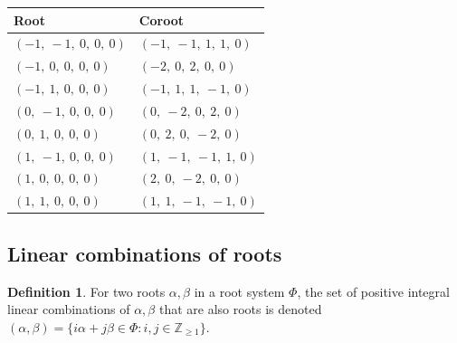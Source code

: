 \documentclass[11pt]{article}
\theoremstyle{definition}
\newtheorem{definition}{Definition}[section]
\begin{document}
\begin{tabular}{|l|l|}
    \hline
    \textbf{Root} & \textbf{Coroot} \\
    \hline
    $\left( -1, \  -1, \  0, \  0, \  0\right)$ & $\left( -1, \  -1, \  1, \  1, \  0\right)$ \\
    \hline
    $\left( -1, \  0, \  0, \  0, \  0\right)$ & $\left( -2, \  0, \  2, \  0, \  0\right)$ \\
    \hline
    $\left( -1, \  1, \  0, \  0, \  0\right)$ & $\left( -1, \  1, \  1, \  -1, \  0\right)$ \\
    \hline
    $\left( 0, \  -1, \  0, \  0, \  0\right)$ & $\left( 0, \  -2, \  0, \  2, \  0\right)$ \\
    \hline
    $\left( 0, \  1, \  0, \  0, \  0\right)$ & $\left( 0, \  2, \  0, \  -2, \  0\right)$ \\
    \hline
    $\left( 1, \  -1, \  0, \  0, \  0\right)$ & $\left( 1, \  -1, \  -1, \  1, \  0\right)$ \\
    \hline
    $\left( 1, \  0, \  0, \  0, \  0\right)$ & $\left( 2, \  0, \  -2, \  0, \  0\right)$ \\
    \hline
    $\left( 1, \  1, \  0, \  0, \  0\right)$ & $\left( 1, \  1, \  -1, \  -1, \  0\right)$ \\
    \hline
\end{tabular}


\subsection{Linear combinations of roots}

\begin{definition}
For two roots $\alpha, \beta$ in a root system $\Phi$, the set of positive integral linear combinations of $\alpha, \beta$ that are also roots is denoted
\(
	(\alpha, \beta) = \{ i \alpha + j \beta \in \Phi : i, j \in \mathbb{Z}_{\ge 1} \}
\).
\end{definition}
\end{document}
